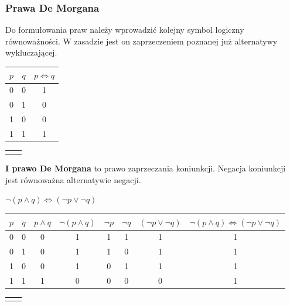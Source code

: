 \documentclass[a4paper,12pt]{article}
\begin{document}
\subsubsection{Prawa De Morgana}
Do formułowania praw należy wprowadzić kolejny symbol logiczny równoważności. W zasadzie jest on zaprzeczeniem poznanej już alternatywy wykluczającej.

\begin{table}[h!]
\centering

\begin{minipage}{5.5cm}
\centering

\begin{tabular}{ | c | c || c | }
  \hline
  $p$ & $q$ & $p \iff q$ \\ \hline
  0 & 0 & 1 \\
  0 & 1 & 0 \\
  1 & 0 & 0 \\
  1 & 1 & 1 \\
  \hline
\end{tabular}
\end{minipage}
\begin{minipage}{11cm}
\begin{tabular}{  c r }
  & \\
\end{tabular}
\end{minipage}
\end{table}

\textbf{I prawo De Morgana} to prawo zaprzeczania koniunkcji. Negacja koniunkcji jest równoważna alternatywie negacji.

$\lnot (p \land q) \iff (\lnot p \lor \lnot q)$

\begin{table}[h!]
\centering

\begin{minipage}{15cm}
\centering

\begin{tabular}{ | c | c || c | c || c | c | c || c | }
  \hline
  $p$ & $q$ & $p \land q$ & $\lnot (p \land q)$ & $\lnot p$ & $\lnot q$ & $(\lnot p \lor \lnot q)$ & $\lnot (p \land q) \iff (\lnot p \lor \lnot q)$ \\ \hline
  0 & 0 & 0 & 1 & 1 & 1 & 1 & 1 \\
  0 & 1 & 0 & 1 & 1 & 0 & 1 & 1 \\
  1 & 0 & 0 & 1 & 0 & 1 & 1 & 1 \\
  1 & 1 & 1 & 0 & 0 & 0 & 0 & 1 \\
  \hline
\end{tabular}

\end{minipage}
\begin{minipage}{0.5cm}
\begin{tabular}{  c r }
  & \\
\end{tabular}
\end{minipage}
\end{table}
\end{document}
